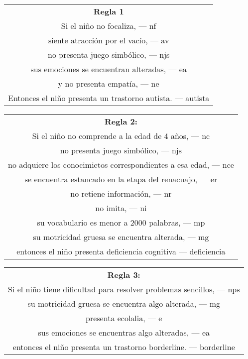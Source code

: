\documentclass[letterpaper,12pt]{article}
\begin{document}
\begin{center}
\begin{tabular}{|c|}
\hline 
\textbf{Regla 1} \\ 
Si el niño no focaliza, — nf \\
siente atracción por el vacío, — av \\
no presenta juego simbólico, — njs \\
sus emociones se encuentran alteradas, — ea \\
y no presenta empatía, — ne \\ 
Entonces el niño presenta un trastorno autista. — autista \\
\hline 
\end{tabular} 
\end{center}
\begin{center}
\begin{tabular}{|c|}
\hline 
 \textbf{Regla 2:} \\
Si el niño no comprende a la edad de 4 años, — nc \\
no presenta juego simbólico, — njs \\
no adquiere los conocimietos correspondientes a esa edad, — nce\\
se encuentra estancado en la etapa del renacuajo, — er\\
no retiene información, — nr \\
no imita, — ni \\
su vocabulario es menor a 2000 palabras, — mp \\
su motricidad gruesa se encuentra alterada, — mg \\
entonces el niño presenta deficiencia cognitiva — deficiencia\\ 
\hline 
\end{tabular} 
\end{center}

\begin{center}
\begin{tabular}{|c|}
\hline 
\textbf{Regla 3:} \\
Si el niño tiene dificultad para resolver problemas sencillos, — nps\\
su motricidad gruesa se encuentra algo alterada, — mg\\
presenta ecolalia, — e\\
sus emociones se encuentras algo alteradas, — ea\\
entonces el niño presenta un trastorno borderline. — borderline \\ 
\hline 
\end{tabular} 
\end{center}
\end{document}
